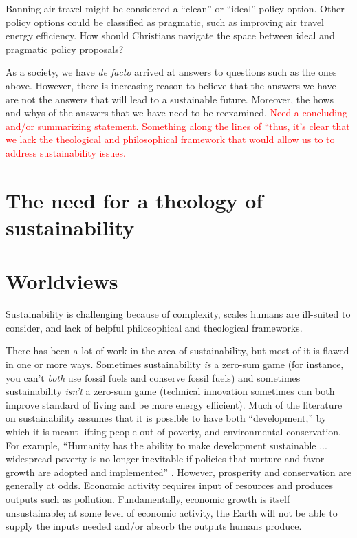 \documentclass[12pt]{article}
\newcommand{\ins}[1]{\textcolor{red}{#1}}
\begin{document}
Banning air travel might be considered a ``clean'' or ``ideal'' policy option. Other policy options could be classified
as pragmatic, such as improving air travel energy efficiency. How should Christians navigate the space between ideal and
pragmatic policy proposals?



As a society, we have \emph{de facto} arrived at answers to questions such as the ones above. However, 
there is increasing reason to believe that the answers we have are not the answers that will lead to a sustainable future.
Moreover, the hows and whys of the answers that we have need to be reexamined.
\ins{Need a concluding and/or summarizing statement. Something along the lines of ``thus, it's clear that we lack the theological
and philosophical framework that would allow us to to address sustainability issues.}



\section{The need for a theology of sustainability}
\label{sec:need_for_theology_of_sustainability}



\section{Worldviews}
\label{sec:worldviews}

Sustainability is challenging because of complexity, scales humans are ill-suited to consider, 
and lack of helpful philosophical and theological frameworks.

There has been a lot of work in the area of sustainability, but most of it is flawed in one or more ways.
Sometimes sustainability \emph{is} a zero-sum game 
(for instance, you can't \emph{both} use fossil fuels and conserve fossil fuels)
and sometimes sustainability \emph{isn't} a zero-sum game 
(technical innovation sometimes can both improve standard of living and be more energy efficient).
Much of the literature on sustainability assumes that it is possible to have both ``development,'' by which it is meant lifting people out of poverty,
and environmental conservation. 
For example, ``Humanity has the ability to make development sustainable ... widespread poverty is no
longer inevitable if policies that nurture and favor growth are adopted and implemented'' \cite{Ngome2015}.
However, prosperity and conservation are generally at odds. Economic activity requires input of resources
and produces outputs such as pollution. Fundamentally, economic growth is itself unsustainable; at some level of economic activity,
the Earth will not be able to supply the inputs needed and/or absorb the outputs humans produce.
\end{document}
